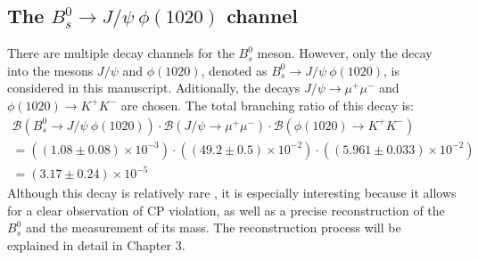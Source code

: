 \subsection{The $B^0_s \to J/\psi \ \phi(1020)$ channel}
\label{subsec:channel}
There are multiple decay channels for the $B^0_s$ meson. However, only the decay into the mesons $J/\psi$ and $\phi(1020)$, denoted as $B^0_s \to J/\psi \ \phi(1020)$, is considered in this manuscript. Aditionally, the decays $J/\psi \to \mu^{+} \mu^{-}$ and $\phi(1020) \to K^{+} K^{-}$ are chosen. The total branching ratio of this decay is:
\begin{equation}
	\label{eq:br}
	\begin{split}
	\mathcal{B} \left(B^0_s \to J/\psi \ \phi(1020) \right) \cdot	\mathcal{B} \left(J/\psi \to \mu^{+} \mu^{-} \right) \cdot \mathcal{B} \left(\phi(1020) \to K^{+} K^{-} \right)  \\
	 = ((1.08 \pm 0.08) \times 10^{-3}) \cdot ((49.2 \pm 0.5) \times 10^{-2}) \cdot ((5.961 \pm 0.033) \times 10^{-2}) \\ = (3.17 \pm 0.24) \times 10^{-5}
	\end{split}
\end{equation}
Although this decay is relatively rare \cite{bragagnolo2021measurement}, it is especially interesting because it allows for a clear observation of CP violation, as well as a precise reconstruction of the $B^0_s$ and the measurement of its mass. The reconstruction process will be explained in detail in Chapter 3.